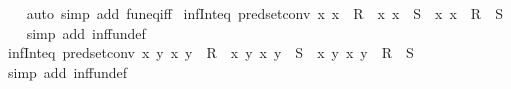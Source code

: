 \begin{isabellebody}
%
\isadelimproof
\ \ %
\endisadelimproof
%
\isatagproof
{}\isamarkupfalse%
\ {\isacharparenleft}{\kern0pt}auto\ simp\ add{\isacharcolon}{\kern0pt}\ fun{\isacharunderscore}{\kern0pt}eq{\isacharunderscore}{\kern0pt}iff{\isacharparenright}{\kern0pt}%
\endisatagproof
{\isafoldproof}%
%
\isadelimproof
\isanewline
%
\endisadelimproof
\isanewline
{}\isamarkupfalse%
\ inf{\isacharunderscore}{\kern0pt}Int{\isacharunderscore}{\kern0pt}eq\ {\isacharbrackleft}{\kern0pt}pred{\isacharunderscore}{\kern0pt}set{\isacharunderscore}{\kern0pt}conv{\isacharbrackright}{\kern0pt}{\isacharcolon}{\kern0pt}\ {\isachardoublequoteopen}{\isacharparenleft}{\kern0pt}{\isasymlambda}x{\isachardot}{\kern0pt}\ x\ {\isasymin}\ R{\isacharparenright}{\kern0pt}\ {\isasymsqinter}\ {\isacharparenleft}{\kern0pt}{\isasymlambda}x{\isachardot}{\kern0pt}\ x\ {\isasymin}\ S{\isacharparenright}{\kern0pt}\ {\isacharequal}{\kern0pt}\ {\isacharparenleft}{\kern0pt}{\isasymlambda}x{\isachardot}{\kern0pt}\ x\ {\isasymin}\ R\ {\isasyminter}\ S{\isacharparenright}{\kern0pt}{\isachardoublequoteclose}\isanewline
%
\isadelimproof
\ \ %
\endisadelimproof
%
\isatagproof
{}\isamarkupfalse%
\ {\isacharparenleft}{\kern0pt}simp\ add{\isacharcolon}{\kern0pt}\ inf{\isacharunderscore}{\kern0pt}fun{\isacharunderscore}{\kern0pt}def{\isacharparenright}{\kern0pt}%
\endisatagproof
{\isafoldproof}%
%
\isadelimproof
\isanewline
%
\endisadelimproof
\isanewline
{}\isamarkupfalse%
\ inf{\isacharunderscore}{\kern0pt}Int{\isacharunderscore}{\kern0pt}eq{}\ {\isacharbrackleft}{\kern0pt}pred{\isacharunderscore}{\kern0pt}set{\isacharunderscore}{\kern0pt}conv{\isacharbrackright}{\kern0pt}{\isacharcolon}{\kern0pt}\ {\isachardoublequoteopen}{\isacharparenleft}{\kern0pt}{\isasymlambda}x\ y{\isachardot}{\kern0pt}\ {\isacharparenleft}{\kern0pt}x{\isacharcomma}{\kern0pt}\ y{\isacharparenright}{\kern0pt}\ {\isasymin}\ R{\isacharparenright}{\kern0pt}\ {\isasymsqinter}\ {\isacharparenleft}{\kern0pt}{\isasymlambda}x\ y{\isachardot}{\kern0pt}\ {\isacharparenleft}{\kern0pt}x{\isacharcomma}{\kern0pt}\ y{\isacharparenright}{\kern0pt}\ {\isasymin}\ S{\isacharparenright}{\kern0pt}\ {\isacharequal}{\kern0pt}\ {\isacharparenleft}{\kern0pt}{\isasymlambda}x\ y{\isachardot}{\kern0pt}\ {\isacharparenleft}{\kern0pt}x{\isacharcomma}{\kern0pt}\ y{\isacharparenright}{\kern0pt}\ {\isasymin}\ R\ {\isasyminter}\ S{\isacharparenright}{\kern0pt}{\isachardoublequoteclose}\isanewline
%
\isadelimproof
\ \ %
\endisadelimproof
%
\isatagproof
{}\isamarkupfalse%
\ {\isacharparenleft}{\kern0pt}simp\ add{\isacharcolon}{\kern0pt}\ inf{\isacharunderscore}{\kern0pt}fun{\isacharunderscore}{\kern0pt}def{\isacharparenright}{\kern0pt}%

\end{isabellebody}
